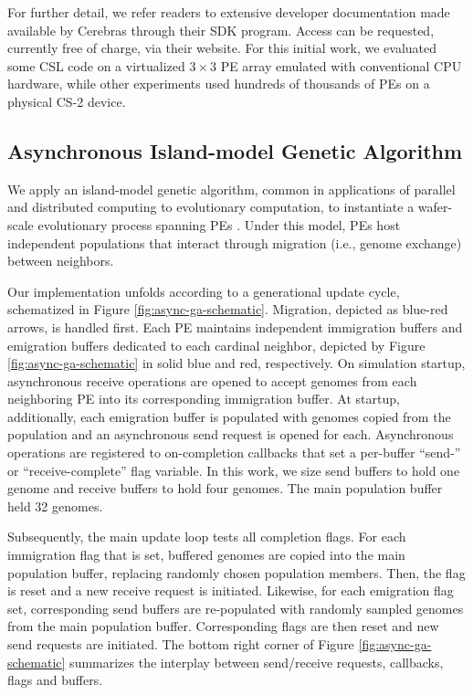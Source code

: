 For further detail, we refer readers to extensive developer documentation made available by Cerebras through their SDK program.
Access can be requested, currently free of charge, via their website.
For this initial work, we evaluated some CSL code on a virtualized $3\times3$ PE array emulated with conventional CPU hardware, while other experiments used hundreds of thousands of PEs on a physical CS-2 device.

\subsection{Asynchronous Island-model Genetic Algorithm}



We apply an island-model genetic algorithm, common in applications of parallel and distributed computing to evolutionary computation, to instantiate a wafer-scale evolutionary process spanning PEs \citep{bennett1999building}.
Under this model, PEs host independent populations that interact through migration (i.e., genome exchange) between neighbors.

Our implementation unfolds according to a generational update cycle, schematized in Figure \ref{fig:async-ga-schematic}.
Migration, depicted as blue-red arrows, is handled first.
Each PE maintains independent immigration buffers and emigration buffers dedicated to each cardinal neighbor, depicted by Figure \ref{fig:async-ga-schematic} in solid blue and red, respectively.
On simulation startup, asynchronous receive operations are opened to accept genomes from each neighboring PE into its corresponding immigration buffer.
At startup, additionally, each emigration buffer is populated with genomes copied from the population and an asynchronous send request is opened for each. %
Asynchronous operations are registered to on-completion callbacks that set a per-buffer ``send-'' or ``receive-complete'' flag variable.
In this work, we size send buffers to hold one genome and receive buffers to hold four genomes.
The main population buffer held 32 genomes.

Subsequently, the main update loop tests all completion flags.
For each immigration flag that is set, buffered genomes are copied into the main population buffer, replacing randomly chosen population members.
Then, the flag is reset and a new receive request is initiated.
Likewise, for each emigration flag set, corresponding send buffers are re-populated with randomly sampled genomes from the main population buffer.
Corresponding flags are then reset and new send requests are initiated.
The bottom right corner of Figure \ref{fig:async-ga-schematic} summarizes the interplay between send/receive requests, callbacks, flags and buffers.

